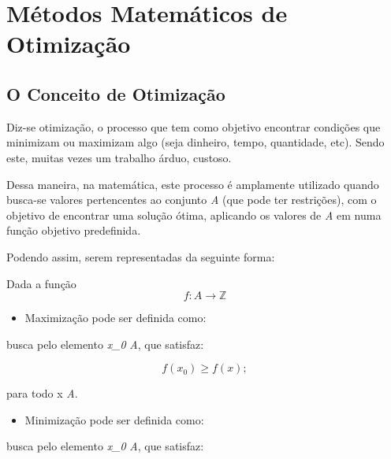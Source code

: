 

\chapter{\Large{Métodos Matemáticos de Otimização}}\label{chp:1}


\section{{O Conceito de Otimização}}

\hspace{0.8cm}
Diz-se otimização, o processo que tem como objetivo encontrar condições que
minimizam ou maximizam algo (seja dinheiro, tempo, quantidade, etc). Sendo este,
muitas vezes um trabalho árduo, custoso.

Dessa maneira, na matemática, este processo é amplamente utilizado quando
busca-se valores pertencentes ao conjunto \textit{A} (que pode ter
restrições), com o objetivo de encontrar uma solução ótima, aplicando os valores
de \textit{A} em numa função objetivo predefinida.

Podendo assim, serem representadas da seguinte forma:

	Dada a função
	\begin{equation}
		f : A \rightarrow \mathbb{Z}
	\end{equation}

	\begin{itemize}
		\item Maximização pode ser definida como:
	\end{itemize}

		busca pelo elemento \textit{x_0} \in \textit{A}, que satisfaz:

			\begin{equation}
				f(x_0) \geq f(x);
			\end{equation}

		para todo x \in \textit{A}.\\


	\begin{itemize}
		\item Minimização pode ser definida como:
	\end{itemize}

		busca pelo elemento \textit{x_0} \in \textit{A}, que satisfaz:

